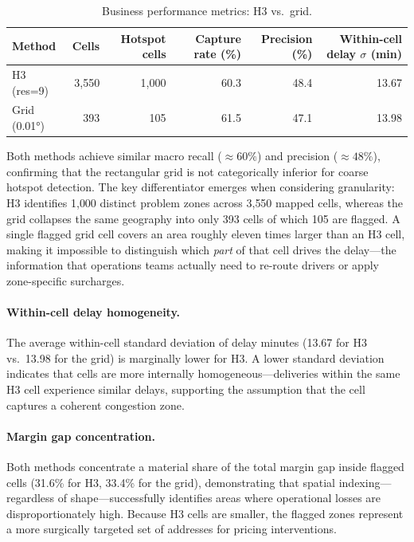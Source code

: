 \begin{table}[h]
\centering
\caption{Business performance metrics: H3 vs.\ grid.}
\label{tab:business_metrics}
\begin{tabular}{lrrrrr}
\toprule
\textbf{Method} & \textbf{Cells} & \textbf{Hotspot cells}
  & \textbf{Capture rate (\%)} & \textbf{Precision (\%)}
  & \textbf{Within-cell delay $\sigma$ (min)} \\
\midrule
H3 (res=9)  & 3{,}550 & 1{,}000 & 60.3 & 48.4 & 13.67 \\
Grid (0.01°) &   393  &   105  & 61.5 & 47.1 & 13.98 \\
\bottomrule
\end{tabular}
\end{table}

Both methods achieve similar macro recall (${\approx}60\%$) and precision
(${\approx}48\%$), confirming that the rectangular grid is not categorically
inferior for coarse hotspot detection.
The key differentiator emerges when considering granularity: H3 identifies
1{,}000 distinct problem zones across 3{,}550 mapped cells, whereas the grid
collapses the same geography into only 393 cells of which 105 are flagged.
A single flagged grid cell covers an area roughly eleven times larger than an
H3 cell, making it impossible to distinguish which \emph{part} of that cell
drives the delay—the information that operations teams actually need to re-route
drivers or apply zone-specific surcharges.

\paragraph{Within-cell delay homogeneity.}
The average within-cell standard deviation of delay minutes (13.67 for H3
vs.\ 13.98 for the grid) is marginally lower for H3.
A lower standard deviation indicates that cells are more internally
homogeneous—deliveries within the same H3 cell experience similar delays,
supporting the assumption that the cell captures a coherent congestion zone.

\paragraph{Margin gap concentration.}
Both methods concentrate a material share of the total margin gap inside
flagged cells (31.6\% for H3, 33.4\% for the grid), demonstrating that
spatial indexing—regardless of shape—successfully identifies areas where
operational losses are disproportionately high.
Because H3 cells are smaller, the flagged zones represent a more surgically
targeted set of addresses for pricing interventions.

